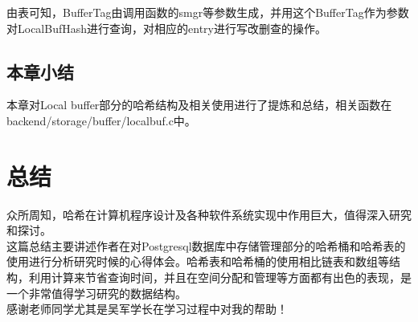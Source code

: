 \documentclass{article}
\begin{document}
\begin{CJK*}{UTF8}{gkai}
\indent 由表可知，BufferTag由调用函数的smgr等参数生成，并用这个BufferTag作为参数对LocalBufHash进行查询，对相应的entry进行写改删查的操作。

\subsection{本章小结}
\indent 本章对Local buffer部分的哈希结构及相关使用进行了提炼和总结，相关函数在backend/storage/buffer/localbuf.c中。

\section{总结}
\indent 众所周知，哈希在计算机程序设计及各种软件系统实现中作用巨大，值得深入研究和探讨。\\
\indent 这篇总结主要讲述作者在对Postgresql数据库中存储管理部分的哈希桶和哈希表的使用进行分析研究时候的心得体会。哈希表和哈希桶的使用相比链表和数组等结构，利用计算来节省查询时间，并且在空间分配和管理等方面都有出色的表现，是一个非常值得学习研究的数据结构。\\
\indent 感谢老师同学尤其是吴军学长在学习过程中对我的帮助！



\end{CJK*}
\end{document}
